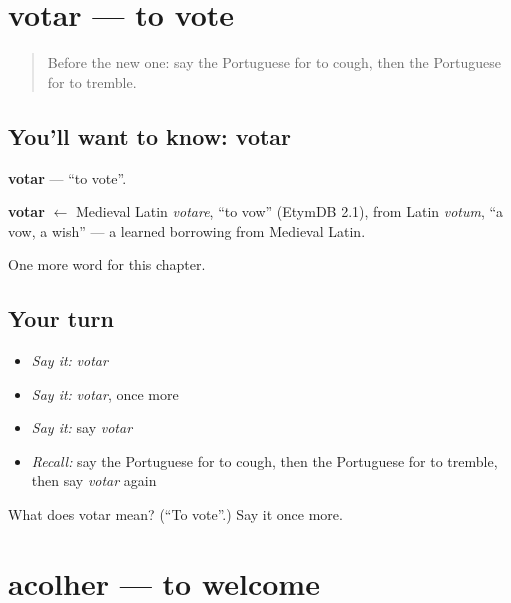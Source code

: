 \section[votar]{votar — to vote}

\label{lesson:PT-C146-votar}



\begin{quote}
Before the new one: say the Portuguese for to cough, then the Portuguese for to tremble.
\end{quote}

\subsection*{You'll want to know: votar}
\textbf{votar} — \textquotedblleft{}to vote\textquotedblright{}.

\begin{cousinweb}
\textbf{votar} $\leftarrow$ Medieval Latin \emph{votare}, \textquotedblleft{}to vow\textquotedblright{} (EtymDB 2.1), from Latin \emph{votum}, \textquotedblleft{}a vow, a wish\textquotedblright{} — a learned borrowing from Medieval Latin.
\end{cousinweb}

\begin{grammarlens}[title={What you've built}]
One more word for this chapter.
\end{grammarlens}

\subsection*{Your turn}
\begin{itemize}
\raggedright
  \item \emph{Say it:} \emph{votar}
  \item \emph{Say it:} \emph{votar}, once more
  \item \emph{Say it:} say \emph{votar}
  \item \emph{Recall:} say the Portuguese for to cough, then the Portuguese for to tremble, then say \emph{votar} again
\end{itemize}

\begin{tcolorbox}[breakable,colback=teal!4,colframe=teal!35!black,title={Before you move on}]
What does votar mean? (\textquotedblleft{}To vote\textquotedblright{}.) Say it once more.
\end{tcolorbox}
\section[acolher]{acolher — to welcome}

